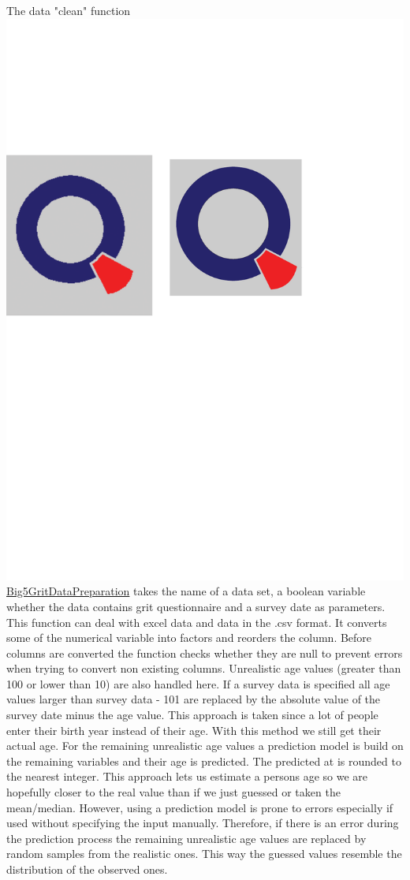 \newline
The data "clean" function \href{https://https://github.com/Matthias2193/SPL/commit/7a9a8e8f543d93d635e4eeefad63280a26be99ad}{\includegraphics[scale = 0.06]{Figures/qletlogo.pdf}Big5GritDataPreparation} takes the name of a data set, a boolean variable whether the data contains grit questionnaire and a survey date as parameters. This function can deal with excel data and data in the .csv format. It converts some of the numerical variable into factors and reorders the column. Before columns are converted the function checks whether they are null to prevent errors when trying to convert non existing columns. Unrealistic age values (greater than 100 or lower than 10) are also handled here. If a survey data is specified all age values larger than survey data - 101 are replaced by the absolute value of the survey date minus the age value. This approach is taken since a lot of people enter their birth year instead of their age. With this method we still get their actual age. For the remaining unrealistic age values a prediction model is build on the remaining variables and their age is predicted. The predicted at is rounded to the nearest integer. This approach lets us estimate a persons age so we are hopefully closer to the real value than if we just guessed or taken the mean/median. However, using a prediction model is prone to errors especially if used without specifying the input manually. Therefore, if there is an error during the prediction process the remaining unrealistic age values are replaced by random samples from the realistic ones. This way the guessed values resemble the distribution of the observed ones.
